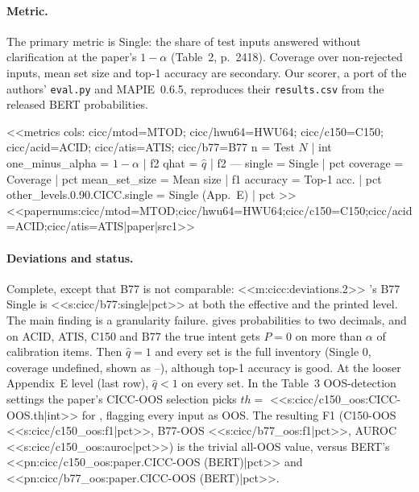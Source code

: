 \paragraph{Metric.} The primary metric is Single: the share of test inputs answered without clarification at the
paper's $1-\alpha$ (Table~2, p.~2418). Coverage over non-rejected inputs, mean set size and top-1 accuracy are
secondary. Our scorer, a port of the authors' \texttt{eval.py} and MAPIE~0.6.5, reproduces their
\texttt{results.csv} from the released BERT probabilities.

{\setlength{\tabcolsep}{2.4pt}
<<metrics
cols: cicc/mtod=MTOD; cicc/hwu64=HWU64; cicc/c150=C150; cicc/acid=ACID; cicc/atis=ATIS; cicc/b77=B77
n = Test $N$ | int
one_minus_alpha = $1-\alpha$ | f2
qhat = $\hat q$ | f2
---
single = Single | pct
coverage = Coverage | pct
mean_set_size = Mean size | f1
accuracy = Top-1 acc. | pct
other_levels.0.90.CICC.single = Single (App.~E) | pct
>>
<<papernums:cicc/mtod=MTOD;cicc/hwu64=HWU64;cicc/c150=C150;cicc/acid=ACID;cicc/atis=ATIS|paper|src1>>}

\paragraph{Deviations and status.} Complete, except that B77 is not comparable: <<m:cicc:deviations.2>> \jev{}'s
B77 Single is <<s:cicc/b77:single|pct>> at both the effective and the printed level. The main finding is a
granularity failure. \jev{} gives probabilities to two decimals, and on ACID, ATIS, C150 and B77 the true intent
gets $P=0$ on more than $\alpha$ of calibration items. Then $\hat q=1$ and every set is the full inventory (Single 0,
coverage undefined, shown as --), although top-1 accuracy is good. At the looser Appendix~E level (last row),
$\hat q<1$ on every set. In the Table~3 OOS-detection settings the paper's CICC-OOS selection picks
$\mathit{th}=$ <<s:cicc/c150_oos:CICC-OOS.th|int>> for \jev{}, flagging every input as OOS. The resulting F1
(C150-OOS <<s:cicc/c150_oos:f1|pct>>, B77-OOS <<s:cicc/b77_oos:f1|pct>>, AUROC <<s:cicc/c150_oos:auroc|pct>>) is
the trivial all-OOS value, versus BERT's <<pn:cicc/c150_oos:paper.CICC-OOS (BERT)|pct>> and
<<pn:cicc/b77_oos:paper.CICC-OOS (BERT)|pct>>.
